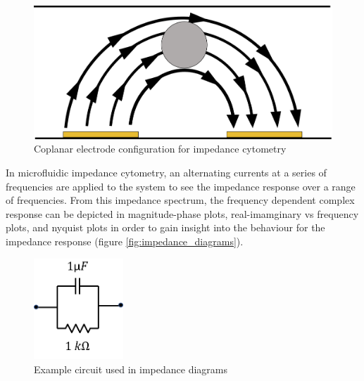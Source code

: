  
 \begin{figure}[ht]
     \centering
     \includegraphics[width=\textwidth]{images/coplanar.png}
     \caption{Coplanar electrode configuration for impedance cytometry}
     \label{fig:coplanar_electrodes}
 \end{figure}
 
 \par In microfluidic impedance cytometry, an alternating currents at a series of frequencies are applied to the system to see the impedance response over a range of frequencies. From this impedance spectrum, the frequency dependent complex response can be depicted in magnitude-phase plots, real-imamginary vs frequency plots, and nyquist plots in order to gain insight into the behaviour for the impedance response (figure \ref{fig:impedance_diagrams}). 
 

\begin{figure}[ht]
    \centering
    \includegraphics[width=0.3\textwidth]{images/exampleCircuit.png}
    \caption{Example circuit used in impedance diagrams}
    \label{fig:example_circuit}
\end{figure} 
 
